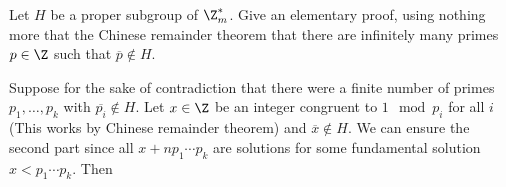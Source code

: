 \documentclass[11pt,letterpaper]{article}
\begin{document}
\begin{cproblem}{7.6}
    Let $H$ be a proper subgroup of $\Z^*_m$. Give an elementary proof, using nothing more that the Chinese remainder theorem that there are infinitely many primes $p\in \Z$ such that $\overline{p}\not\in H$.
\end{cproblem}

\begin{solution}
    Suppose for the sake of contradiction that there were a finite number of primes $p_1,\ldots,p_k$ with $\overline{p_i}\not\in H$. Let $x\in \Z$ be an integer congruent to $1\mod p_i$ for all $i$ (This works by Chinese remainder theorem) and $\overline{x}\not\in H$. We can ensure the second part since all $x+np_1\cdots p_k$ are solutions for some fundamental solution $x<p_1\cdots p_k$. Then 
\end{solution}
\end{document}
